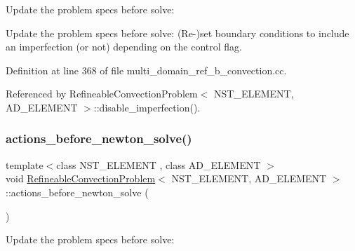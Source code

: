 Update the problem specs before solve\+: 

Update the problem specs before solve\+: (Re-\/)set boundary conditions to include an imperfection (or not) depending on the control flag. 

Definition at line 368 of file multi\+\_\+domain\+\_\+ref\+\_\+b\+\_\+convection.\+cc.



Referenced by Refineable\+Convection\+Problem$<$ N\+S\+T\+\_\+\+E\+L\+E\+M\+E\+N\+T, A\+D\+\_\+\+E\+L\+E\+M\+E\+N\+T $>$\+::disable\+\_\+imperfection().

\mbox{\label{classRefineableConvectionProblem_ae0e627f882cd8faa305392e615331e51}} 
\subsubsection{\texorpdfstring{actions\+\_\+before\+\_\+newton\+\_\+solve()}{actions\_before\_newton\_solve()}\hspace{0.1cm}{\footnotesize\ttfamily [2/2]}}
{\footnotesize\ttfamily template$<$class N\+S\+T\+\_\+\+E\+L\+E\+M\+E\+NT , class A\+D\+\_\+\+E\+L\+E\+M\+E\+NT $>$ \\
void \hyperlink{classRefineableConvectionProblem}{Refineable\+Convection\+Problem}$<$ N\+S\+T\+\_\+\+E\+L\+E\+M\+E\+NT, A\+D\+\_\+\+E\+L\+E\+M\+E\+NT $>$\+::actions\+\_\+before\+\_\+newton\+\_\+solve (\begin{DoxyParamCaption}{ }\end{DoxyParamCaption})}



Update the problem specs before solve\+: 

\mbox{\label{classRefineableConvectionProblem_a6070d18df944a34ce2af1514c30ebea2}} 
